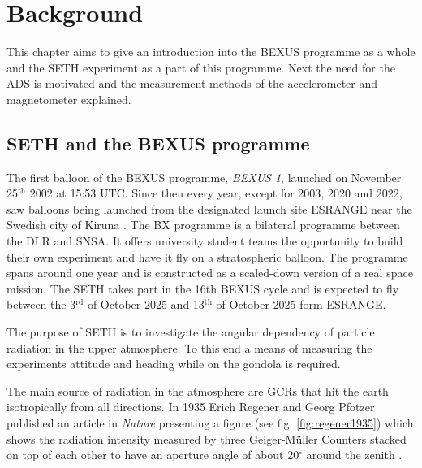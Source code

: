 \chapter{Background \label{ch:background}}
This chapter aims to give an introduction into the \acf{BEXUS} programme as a whole and the \acf{SETH} experiment as a part of this programme. Next the need for the \acf{ADS} is motivated and the measurement methods of the accelerometer and magnetometer explained.

\section{\acs{SETH} and the \acs{BEXUS} programme \label{sec:bg:seth_and_bx_programme}}

The first balloon of the \ac{BEXUS} programme, \textit{BEXUS 1}, launched on November 25$^{\mathrm{th}}$ 2002 at 15:53 UTC. Since then every year, except for 2003, 2020 and 2022, saw balloons being launched from the designated launch site \ac{ESRANGE} near the Swedish city of Kiruna \cite{IAC-08.E.1.1.4}\cite{bexus-campaign-history}.
The \acf{BX} programme is a bilateral programme between the \acf{DLR} and \acf{SNSA}. It offers university student teams the opportunity to build their own experiment and have it fly on a stratospheric balloon. The programme spans around one year and is constructed as a scaled-down version of a real space mission. The \acf{SETH} takes part in the 16th \ac{BEXUS} cycle and is expected to fly between the 3$^\mathrm{rd}$ of October 2025 and 13$^\mathrm{th}$ of October 2025 form \ac{ESRANGE}.

The purpose of \ac{SETH} is to investigate the angular dependency of particle radiation in the upper atmosphere. To this end a means of measuring the experiments attitude and heading while on the gondola is required.

The main source of radiation in the atmosphere are \acp{GCR} that hit the earth isotropically from all directions. In 1935 Erich Regener and Georg Pfotzer published an article in \textit{Nature} presenting a figure (see fig. \ref{fig:regener1935}) which shows the radiation intensity measured by three Geiger-Müller Counters stacked on top of each other to have an aperture angle of about 20$^\circ$ around the zenith \cite{regener-pfotzer-1935}.

